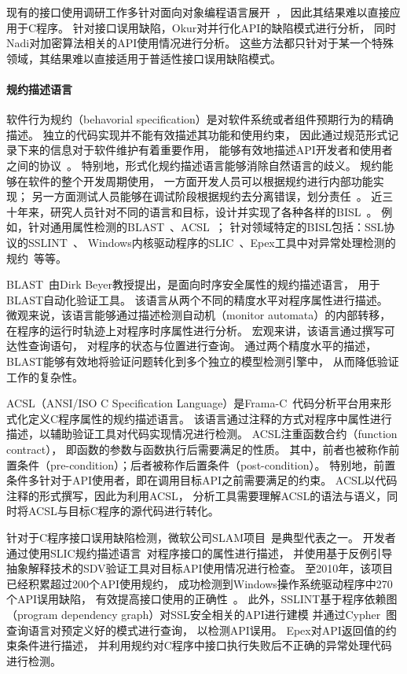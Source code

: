 现有的接口使用调研工作多针对面向对象编程语言展开~\cite{16-icse-cry,17-tse-survey, 12-fse-parallel,12-fse-deprecation}，
因此其结果难以直接应用于C程序。
针对接口误用缺陷，Okur对并行化API的缺陷模式进行分析，
同时Nadi对加密算法相关的API使用情况进行分析。
这些方法都只针对于某一个特殊领域，其结果难以直接适用于普适性接口误用缺陷模式。


\paragraph{规约描述语言}
软件行为规约（behavorial specification）是对软件系统或者组件预期行为的精确描述。
独立的代码实现并不能有效描述其功能和使用约束，
因此通过规范形式记录下来的信息对于软件维护有着重要作用，
能够有效地描述API开发者和使用者之间的协议~\cite{92-ieee-contract}。
特别地，形式化规约描述语言能够消除自然语言的歧义。
规约能够在软件的整个开发周期使用，
一方面开发人员可以根据规约进行内部功能实现；
另一方面测试人员能够在调试阶段根据规约去分离错误，划分责任~\cite{05-vstte-spec}。
近三十年来，研究人员针对不同的语言和目标，设计并实现了各种各样的BISL~\cite{survey12}。
例如，针对通用属性检测的BLAST~\cite{blast}、ACSL~\cite{acsl}；
针对领域特定的BISL包括：SSL协议的SSLINT~\cite{15-sp-sslint}、
Windows内核驱动程序的SLIC~\cite{01-slic}、Epex工具中对异常处理检测的规约~\cite{16-sec-epex}等等。


BLAST~\cite{blast}由Dirk Beyer教授提出，是面向时序安全属性的规约描述语言，
用于BLAST自动化验证工具。
该语言从两个不同的精度水平对程序属性进行描述。
微观来说，该语言能够通过描述检测自动机（monitor automata）的内部转移，
在程序的运行时轨迹上对程序时序属性进行分析。
宏观来讲，该语言通过撰写可达性查询语句，
对程序的状态与位置进行查询。
通过两个精度水平的描述，BLAST能够有效地将验证问题转化到多个独立的模型检测引擎中，
从而降低验证工作的复杂性。

ACSL（ANSI/ISO C Specification Language）是Frama-C~\cite{16-rv-framac}代码分析平台用来形式化定义C程序属性的规约描述语言。
该语言通过注释的方式对程序中属性进行描述，以辅助验证工具对代码实现情况进行检测。
ACSL注重函数合约（function contract），
即函数的参数与函数执行后需要满足的性质。
其中，前者也被称作前置条件（pre-condition）；后者被称作后置条件（post-condition）。
特别地，前置条件多针对于API使用者，即在调用目标API之前需要满足的约束。
ACSL以代码注释的形式撰写，因此为利用ACSL，
分析工具需要理解ACSL的语法与语义，同时将ACSL与目标C程序的源代码进行转化。


针对于C程序接口误用缺陷检测，微软公司SLAM项目~\cite{slam}是典型代表之一。
开发者通过使用SLIC规约描述语言~\cite{01-slic}对程序接口的属性进行描述，
并使用基于反例引导抽象解释技术的SDV验证工具对目标API使用情况进行检查。
至2010年，该项目已经积累超过200个API使用规约，
成功检测到Windows操作系统驱动程序中270个API误用缺陷，
有效提高接口使用的正确性~\cite{10-cad-slam, 11-acm-slam}。
此外，SSLINT基于程序依赖图（program dependency graph）对SSL安全相关的API进行建模
并通过Cypher~\cite{18-sigmod-cypher}图查询语言对预定义好的模式进行查询，
以检测API误用。
Epex对API返回值的约束条件进行描述，
并利用规约对C程序中接口执行失败后不正确的异常处理代码进行检测。

